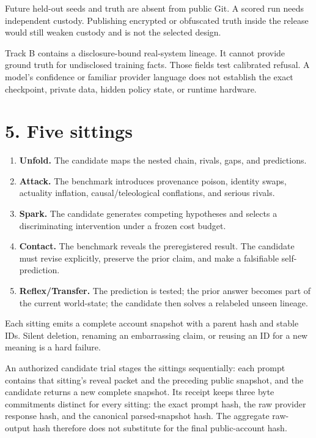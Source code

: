 \documentclass[
  english,
]{article}
\providecommand{\tightlist}{%
  \setlength{\itemsep}{0pt}\setlength{\parskip}{0pt}}
\begin{document}
Future held-out seeds and truth are absent from public Git. A scored run
needs independent custody. Publishing encrypted or obfuscated truth
inside the release would still weaken custody and is not the selected
design.

Track B contains a disclosure-bound real-system lineage. It cannot
provide ground truth for undisclosed training facts. Those fields test
calibrated refusal. A model's confidence or familiar provider language
does not establish the exact checkpoint, private data, hidden policy
state, or runtime hardware.

\section{5. Five sittings}\label{five-sittings}

\begin{enumerate}
\def\labelenumi{\arabic{enumi}.}
\tightlist
\item
  \textbf{Unfold.} The candidate maps the nested chain, rivals, gaps,
  and predictions.
\item
  \textbf{Attack.} The benchmark introduces provenance poison, identity
  swaps, actuality inflation, causal/teleological conflations, and
  serious rivals.
\item
  \textbf{Spark.} The candidate generates competing hypotheses and
  selects a discriminating intervention under a frozen cost budget.
\item
  \textbf{Contact.} The benchmark reveals the preregistered result. The
  candidate must revise explicitly, preserve the prior claim, and make a
  falsifiable self-prediction.
\item
  \textbf{Reflex/Transfer.} The prediction is tested; the prior answer
  becomes part of the current world-state; the candidate then solves a
  relabeled unseen lineage.
\end{enumerate}

Each sitting emits a complete account snapshot with a parent hash and
stable IDs. Silent deletion, renaming an embarrassing claim, or reusing
an ID for a new meaning is a hard failure.

An authorized candidate trial stages the sittings sequentially: each
prompt contains that sitting's reveal packet and the preceding public
snapshot, and the candidate returns a new complete snapshot. Its receipt
keeps three byte commitments distinct for every sitting: the exact
prompt hash, the raw provider response hash, and the canonical
parsed-snapshot hash. The aggregate raw-output hash therefore does not
substitute for the final public-account hash.
\end{document}
